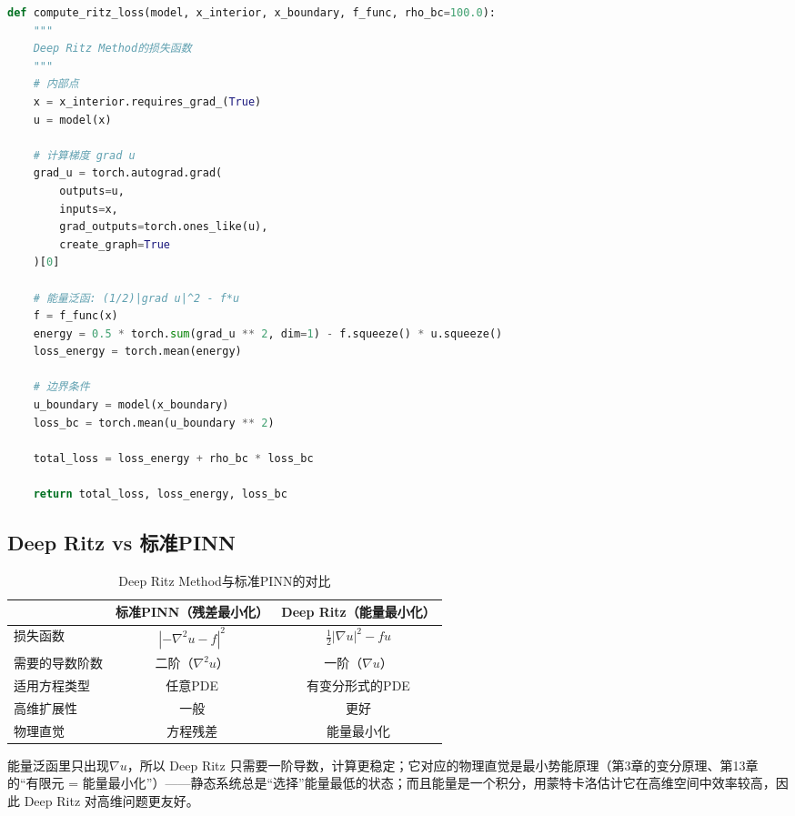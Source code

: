 \begin{lstlisting}[language=Python, caption={Deep Ritz Method的实现}]
def compute_ritz_loss(model, x_interior, x_boundary, f_func, rho_bc=100.0):
    """
    Deep Ritz Method的损失函数
    """
    # 内部点
    x = x_interior.requires_grad_(True)
    u = model(x)
    
    # 计算梯度 grad u
    grad_u = torch.autograd.grad(
        outputs=u,
        inputs=x,
        grad_outputs=torch.ones_like(u),
        create_graph=True
    )[0]
    
    # 能量泛函: (1/2)|grad u|^2 - f*u
    f = f_func(x)
    energy = 0.5 * torch.sum(grad_u ** 2, dim=1) - f.squeeze() * u.squeeze()
    loss_energy = torch.mean(energy)
    
    # 边界条件
    u_boundary = model(x_boundary)
    loss_bc = torch.mean(u_boundary ** 2)
    
    total_loss = loss_energy + rho_bc * loss_bc
    
    return total_loss, loss_energy, loss_bc
\end{lstlisting}

\subsection{Deep Ritz vs 标准PINN}

\begin{table}[htbp]
\centering
\caption{Deep Ritz Method与标准PINN的对比}
\small
\begin{tabular}{l|cc}
\hline
& \textbf{标准PINN（残差最小化）} & \textbf{Deep Ritz（能量最小化）} \\
\hline
损失函数 & $|{-\nabla^2 u - f}|^2$ & $\frac{1}{2}|\nabla u|^2 - fu$ \\
需要的导数阶数 & 二阶（$\nabla^2 u$） & 一阶（$\nabla u$） \\
适用方程类型 & 任意PDE & 有变分形式的PDE \\
高维扩展性 & 一般 & 更好 \\
物理直觉 & 方程残差 & 能量最小化 \\
\hline
\end{tabular}
\end{table}

\begin{tcolorbox}[colback=blue!5, colframe=blue!50, title=Deep Ritz的优势]
能量泛函里只出现$\nabla u$，所以 Deep Ritz 只需要一阶导数，计算更稳定；它对应的物理直觉是最小势能原理（第3章的变分原理、第13章的“有限元 = 能量最小化”）——静态系统总是“选择”能量最低的状态；而且能量是一个积分，用蒙特卡洛估计它在高维空间中效率较高，因此 Deep Ritz 对高维问题更友好。
\end{tcolorbox}

